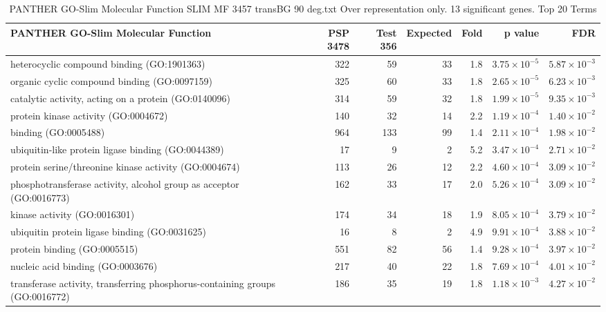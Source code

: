 \begin{table}[ht]
\centering
\begin{adjustbox}{width=\textwidth}
\begin{tabular}{lrrrrrr}
  \hline
PANTHER GO-Slim Molecular Function & PSP 3478 & Test 356 & Expected & Fold & p value & FDR \\ 
  \hline
heterocyclic compound binding (GO:1901363) & 322 & 59 & 33 & 1.8 & $3.75 \times 10^{-5}$ & $5.87 \times 10^{-3}$ \\ 
  organic cyclic compound binding (GO:0097159) & 325 & 60 & 33 & 1.8 & $2.65 \times 10^{-5}$ & $6.23 \times 10^{-3}$ \\ 
  catalytic activity, acting on a protein (GO:0140096) & 314 & 59 & 32 & 1.8 & $1.99 \times 10^{-5}$ & $9.35 \times 10^{-3}$ \\ 
  protein kinase activity (GO:0004672) & 140 & 32 & 14 & 2.2 & $1.19 \times 10^{-4}$ & $1.40 \times 10^{-2}$ \\ 
  binding (GO:0005488) & 964 & 133 & 99 & 1.4 & $2.11 \times 10^{-4}$ & $1.98 \times 10^{-2}$ \\ 
  ubiquitin-like protein ligase binding (GO:0044389) & 17 & 9 & 2 & 5.2 & $3.47 \times 10^{-4}$ & $2.71 \times 10^{-2}$ \\ 
  protein serine/threonine kinase activity (GO:0004674) & 113 & 26 & 12 & 2.2 & $4.60 \times 10^{-4}$ & $3.09 \times 10^{-2}$ \\ 
  phosphotransferase activity, alcohol group as acceptor (GO:0016773) & 162 & 33 & 17 & 2.0 & $5.26 \times 10^{-4}$ & $3.09 \times 10^{-2}$ \\ 
  kinase activity (GO:0016301) & 174 & 34 & 18 & 1.9 & $8.05 \times 10^{-4}$ & $3.79 \times 10^{-2}$ \\ 
  ubiquitin protein ligase binding (GO:0031625) & 16 & 8 & 2 & 4.9 & $9.91 \times 10^{-4}$ & $3.88 \times 10^{-2}$ \\ 
  protein binding (GO:0005515) & 551 & 82 & 56 & 1.4 & $9.28 \times 10^{-4}$ & $3.97 \times 10^{-2}$ \\ 
  nucleic acid binding (GO:0003676) & 217 & 40 & 22 & 1.8 & $7.69 \times 10^{-4}$ & $4.01 \times 10^{-2}$ \\ 
  transferase activity, transferring phosphorus-containing groups (GO:0016772) & 186 & 35 & 19 & 1.8 & $1.18 \times 10^{-3}$ & $4.27 \times 10^{-2}$ \\ 
   \hline
\end{tabular}
\end{adjustbox}
\caption{PANTHER GO-Slim Molecular Function SLIM MF 3457 transBG 90 deg.txt Over representation only. 13 significant genes. Top 20 Terms} 
\label{tab:PANTHER GO-Slim Molecular Function SLIM MF 3457 transBG 90 deg.txt Over representation only. 13 significant genes. Top 20 Terms}
\end{table}

